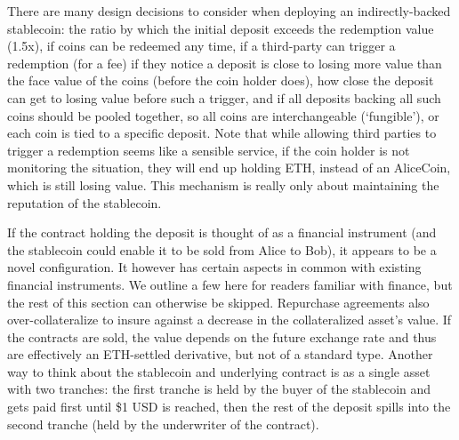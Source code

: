 There are many design decisions to consider when deploying an indirectly-backed stablecoin: the ratio by which the initial deposit exceeds the redemption value (\eg 1.5x), if coins can be redeemed any time, if a third-party can trigger a redemption (\eg for a fee) if they notice a deposit is close to losing more value than the face value of the coins (before the coin holder does), how close the deposit can get to losing value before such a trigger, and if all deposits backing all such coins should be pooled together, so all coins are interchangeable (`fungible'), or each coin is tied to a specific deposit. Note that while allowing third parties to trigger a redemption seems like a sensible service, if the coin holder is not monitoring the situation, they will end up holding ETH, instead of an AliceCoin, which is still losing value. This mechanism is really only about maintaining the reputation of the stablecoin.

If the contract holding the deposit is thought of as a financial instrument (and the stablecoin could enable it to be sold from Alice to Bob), it appears to be a novel configuration. It however has certain aspects in common with existing financial instruments. We outline a few here for readers familiar with finance, but the rest of this section can otherwise be skipped. Repurchase agreements also over-collateralize to insure against a decrease in the collateralized asset's value. If the contracts are sold, the value depends on the future exchange rate and thus are effectively an ETH-settled derivative, but not of a standard type. Another way to think about the stablecoin and underlying contract is as a single asset with two tranches: the first tranche is held by the buyer of the stablecoin and gets paid first until \$1 USD is reached, then the rest of the deposit spills into the second tranche (held by the underwriter of the contract). 



